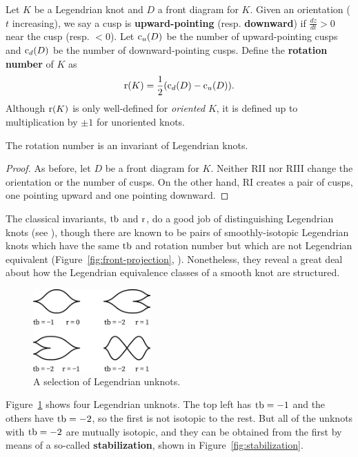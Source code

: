 \begin{definition}
    Let $K$ be a Legendrian knot and $D$ a front diagram for $K$.
    Given an orientation ($t$ increasing), we say a cusp is \textbf{upward-pointing} (resp. \textbf{downward}) if $\frac{dz}{dt} > 0$ near the cusp (resp. $< 0$).
    Let $\operatorname{c}_u(D)$ be the number of upward-pointing cusps and $\operatorname{c}_d(D)$ be the number of downward-pointing cusps. Define the \textbf{rotation number} of $K$ as 
    \[
        \operatorname{r}(K) = \frac{1}{2} (\operatorname{c}_d(D) - \operatorname{c}_u(D)).
    \]
    Although $\operatorname{r}(K)$ is only well-defined for \emph{oriented} $K$, it is defined up to multiplication by $\pm 1$ for unoriented knots.
\end{definition}
\begin{proposition}
    The rotation number is an invariant of Legendrian knots.
\end{proposition}
\begin{proof}
    As before, let $D$ be a front diagram for $K$. Neither RII nor RIII change the orientation or the number of cusps. On the other hand, RI creates a pair of cusps, one pointing upward and one pointing downward.
\end{proof}

The classical invariants, $\operatorname{tb}$ and $\operatorname{r}$, do a good job of distinguishing Legendrian knots  (see \cite{eliashberg2008unknot}), though there are known to be pairs of smoothly-isotopic Legendrian knots which have the same $\operatorname{tb}$ and rotation number but which are not Legendrian equivalent (Figure~\ref{fig:front-projection}, \cite{chekanov}). Nonetheless, they reveal a great deal about how the Legendrian equivalence classes of a smooth knot are structured. 

\begin{figure}
    \centering
    \includegraphics[width=0.4\textwidth]{images/unknots.pdf}
    \caption{A selection of Legendrian unknots.}%
    \label{fig:unknots}
\end{figure}

Figure~\ref{fig:unknots} shows four Legendrian unknots. The top left has $\operatorname{tb} = -1$ and the others have $\operatorname{tb} = -2$, so the first is not isotopic to the rest. But all of the unknots with $\operatorname{tb} = -2$ are mutually isotopic, and they can be obtained from the first by means of a so-called \textbf{stabilization}, shown in Figure~\ref{fig:stabilization}.

